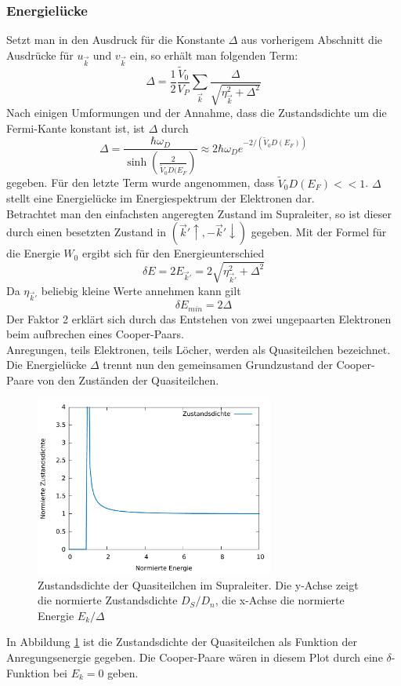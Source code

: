 		\subsubsection{Energielücke}
Setzt man in den Ausdruck für die Konstante $\Delta$ aus vorherigem Abschnitt die
Ausdrücke für $u_{\vec{k}}$ und $v_{\vec{k}}$ ein, so erhält man folgenden Term:
\[
	\Delta = \frac{1}{2} \frac{\tilde{V}_0}{V_P} \sum_{\vec{k}} 
			 \frac{\Delta}{\sqrt{\eta_{\vec{k}}^2 + \Delta^2}}
\]
Nach einigen Umformungen und der Annahme, dass die Zustandsdichte um die Fermi-Kante
konstant ist, ist $\Delta$ durch
\[
	\Delta = \frac{\hbar \omega_D}{\sinh \left( \frac{2}{\tilde{V}_0 D(E_F} \right)}
		   \approx 2 \hbar \omega_D e^{-2 / (\tilde{V}_0 D(E_F))}
\]
gegeben. Für den letzte Term wurde angenommen, dass $\tilde{V}_0 D(E_F) << 1$. 
$\Delta$ stellt eine Energielücke im Energiespektrum der Elektronen dar.\\
Betrachtet man den einfachsten angeregten Zustand im Supraleiter, so ist dieser
durch einen besetzten Zustand in $(\vec{k}' \uparrow, - \vec{k}' \downarrow)$
gegeben. Mit der Formel für die Energie $W_0$ ergibt sich für den 
Energieunterschied
\[
	\delta E = 2 E_{\vec{k}'} = 2 \sqrt{\eta_{\vec{k}'}^2 + \Delta^2}
\]
Da $\eta_{\vec{k}'}$ beliebig kleine Werte annehmen kann gilt 
\[
	\delta E_{min} = 2 \Delta
\]
Der Faktor 2 erklärt sich durch das Entstehen von zwei ungepaarten Elektronen
beim aufbrechen eines Cooper-Paars.\\
Anregungen, teils Elektronen, teils Löcher, werden als Quasiteilchen bezeichnet.
Die Energielücke $\Delta$ trennt nun den gemeinsamen Grundzustand der Cooper-Paare
von den Zuständen der Quasiteilchen.
\begin{figure}[h]
	\centering
	\includegraphics[width=0.7\textwidth]{Abb/plotdos.pdf}
	\caption{Zustandsdichte der Quasiteilchen im Supraleiter. Die y-Achse zeigt 
			 die normierte Zustandsdichte $D_S/D_n$, die x-Achse die normierte
			 Energie $E_k/\Delta$}
	\label{plotdos}
\end{figure}
In Abbildung \ref{plotdos} ist die Zustandsdichte der Quasiteilchen als Funktion
der Anregungsenergie gegeben. Die Cooper-Paare wären in diesem Plot durch eine 
$\delta$-Funktion bei $E_k = 0$ geben.

